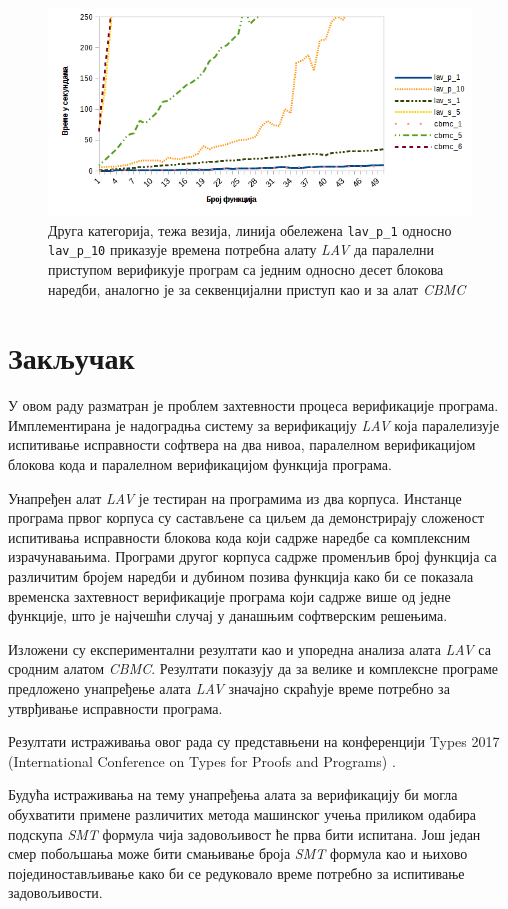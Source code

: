 \documentclass[12pt,oneside]{memoir}
\begin{document}
\begin{figure}[!ht]
  \centering
  \includegraphics[scale=0.8]{img/nivo2T_master.png}
  \caption{Друга категорија, тежа везија, линија обележена \texttt{lav\_p\_1} односно \texttt{lav\_p\_10} приказује времена потребна алату \textit{LAV} да паралелни приступом верификује програм са једним односно десет блокова наредби, аналогно је за секвенцијални приступ као и за алат \textit{CBMC}}
  \label{fig:nivo_2t}
\end{figure}


\chapter{Закључак} \label{zakljucak}

У овом раду разматран је проблем захтевности процеса верификације програма. Имплементирана је надоградња систему за верификацију \textit{LAV} која паралелизује испитивање исправности софтвера на два нивоа, паралелном верификацијом блокова кода и паралелном верификацијом функција програма.

Унапређен алат \textit{LAV} је тестиран на програмима из два корпуса. Инстанце програма првог корпуса су састављене са циљем да демонстрирају сложеност испитивања исправности блокова кода који садрже наредбе са комплексним израчунавањима. Програми другог корпуса садрже променљив број функција са различитим бројем наредби и дубином позива функција како би се показала временска захтевност верификације програма који садрже више од једне функције, што је најчешћи случај у данашњим софтверским решењима.

Изложени су експериментални резултати као и упоредна анализа алата \textit{LAV} са сродним алатом \textit{CBMC}. Резултати показују да за велике и комплексне програме предложено унапређење алата \textit{LAV} значајно скраћује време потребно за утврђивање исправности програма. 

Резултати истраживања овог рада су представњени на конференцији Types 2017 (International Conference on 
Types for Proofs and Programs) \cite{types}.

Будућа истраживања на тему унапређења алата за верификацију би могла обухватити примене различитих метода машинског учења приликом одабира подскупа \textit{SMT} формула чија задовољивост ће прва бити испитана. Још један смер побољшања може бити смањивање броја \textit{SMT} формула као и њихово појединостављивање како би се редуковало време потребно за испитивање задовољивости.


\literatura
\backmatter
\end{document}
